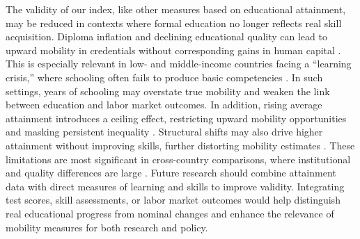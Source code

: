 The validity of our index, like other measures based on educational attainment, may be reduced in contexts where formal education no longer reflects real skill acquisition. Diploma inflation and declining educational quality can lead to upward mobility in credentials without corresponding gains in human capital \citep{van2005social}. This is especially relevant in low- and middle-income countries facing a “learning crisis,” where schooling often fails to produce basic competencies \citep{narayan2018fair, world2018learning}. In such settings, years of schooling may overstate true mobility and weaken the link between education and labor market outcomes. In addition, rising average attainment introduces a ceiling effect, restricting upward mobility opportunities and masking persistent inequality \citep{van2024intergenerational}. Structural shifts may also drive higher attainment without improving skills, further distorting mobility estimates \citep{mueller2021entropy}. These limitations are most significant in cross-country comparisons, where institutional and quality differences are large \citep{narayan2018fair, van2024intergenerational}. Future research should combine attainment data with direct measures of learning and skills to improve validity. Integrating test scores, skill assessments, or labor market outcomes would help distinguish real educational progress from nominal changes and enhance the relevance of mobility measures for both research and policy.

\printbibliography[heading=subbibliography]

